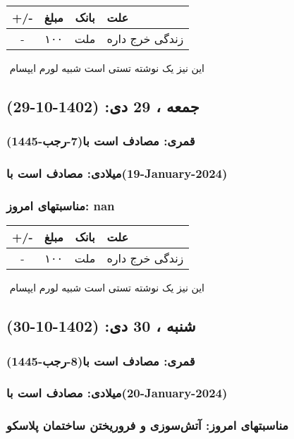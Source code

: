 \documentclass{article}
\newcommand{\rnote}[1]{\marginpar{\textcolor{color}{\StrSubstitute{\##1}{ }{\_}}}}
\newcommand{\myRow}[4]{
    #1 & #2 & #3 & #4 \\ \hline
}
\begin{document}
\begin{tabular}{ | c | c | c | p{5cm} |}
    \hline
    \myRow{ +/- }{مبلغ}{بانک}{علت}
    \myRow{-}{۱۰۰}{ملت}{زندگی خرج داره}
\end{tabular}
\newline
\newline

‌
\rnote{تست}
این نیز یک نوشته تستی است شبیه لورم ایپسام




\newpage
{}
\textcolor{color}{
\section{ جمعه ، 29 دی: (1402-10-29) }
\subsubsection*{قمری: مصادف است با(7-رجب-1445)} 
\subsubsection*{میلادی: مصادف است با(19-January-2024)}
\subsubsection*{مناسبتهای امروز: nan}
}


\begin{tabular}{ | c | c | c | p{5cm} |}
    \hline
    \myRow{ +/- }{مبلغ}{بانک}{علت}
    \myRow{-}{۱۰۰}{ملت}{زندگی خرج داره}
\end{tabular}
\newline
\newline

‌
\rnote{تست}
این نیز یک نوشته تستی است شبیه لورم ایپسام




\newpage
{}
\textcolor{color}{
\section{ شنبه ، 30 دی: (1402-10-30) }
\subsubsection*{قمری: مصادف است با(8-رجب-1445)} 
\subsubsection*{میلادی: مصادف است با(20-January-2024)}
\subsubsection*{مناسبتهای امروز: آتش‌سوزی و فروریختن ساختمان پلاسکو}
}
\end{document}
